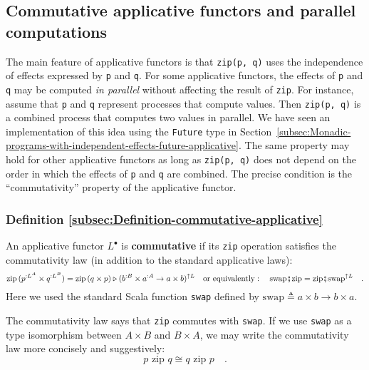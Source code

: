 \subsection{Commutative applicative functors and parallel computations\label{subsec:Commutative-applicative-functors}}

The main feature of applicative functors is that \lstinline!zip(p, q)!
uses the independence of effects expressed by \lstinline!p! and \lstinline!q!.
For some applicative functors, the effects of \lstinline!p! and \lstinline!q!
may be computed \emph{in parallel} without affecting the result of
\lstinline!zip!. For instance, assume that \lstinline!p! and \lstinline!q!
represent processes that compute values. Then \lstinline!zip(p, q)!
is a combined process that computes two values in parallel. We have
seen an implementation of this idea using the \lstinline!Future!
type in Section~\ref{subsec:Monadic-programs-with-independent-effects-future-applicative}.
The same property may hold for other applicative functors as long
as \lstinline!zip(p, q)! does not depend on the order in which the
effects of \lstinline!p! and \lstinline!q! are combined. The precise
condition is the \textsf{``}commutativity\textsf{''} property of the applicative functor.

\subsubsection{Definition \label{subsec:Definition-commutative-applicative}\ref{subsec:Definition-commutative-applicative}}

An applicative functor $L^{\bullet}$ is \textbf{commutative}
if its \lstinline!zip! operation satisfies the commutativity law
(in addition to the standard applicative laws):
\begin{equation}
\text{zip}\,(p^{:L^{A}}\times q^{:L^{B}})=\text{zip}\,(q\times p)\triangleright(b^{:B}\times a^{:A}\rightarrow a\times b)^{\uparrow L}\quad\text{or equivalently}:\quad\text{swap}\bef\text{zip}=\text{zip}\bef\text{swap}^{\uparrow L}\quad.\label{eq:commutativity-law-of-zip}
\end{equation}
Here we used the standard Scala function \lstinline!swap! defined
by $\text{swap}\triangleq a\times b\rightarrow b\times a$. 

The commutativity law says that \lstinline!zip! commutes with \lstinline!swap!.
If we use \lstinline!swap! as a type isomorphism between $A\times B$
and $B\times A$, we may write the commutativity law more concisely
and suggestively:
\[
p\,\,\text{zip}\,\,q\cong q\,\,\text{zip}\,\,p\quad.
\]


